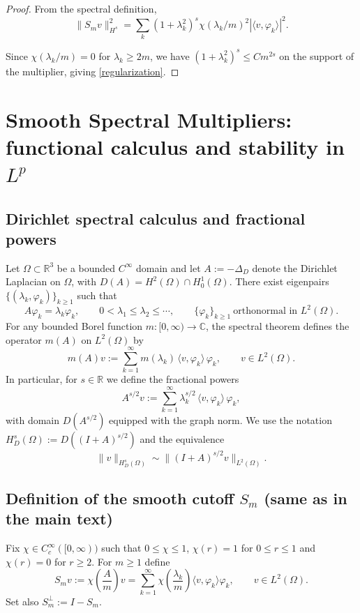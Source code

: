 \documentclass[11pt,letterpaper]{amsart}
\begin{document}
\begin{proof}
From the spectral definition,
\[
\|S_m v\|_{H^s}^2
=
\sum_{k} (1+\lambda_k^2)^s
\chi(\lambda_k/m)^2 |\langle v,\varphi_k\rangle|^2.
\]

Since $\chi(\lambda_k/m)=0$ for $\lambda_k \ge 2m$,
we have $(1+\lambda_k^2)^s \le C m^{2s}$ on the support
of the multiplier, giving \eqref{regularization}.
\end{proof}




\appendix
\section{Smooth Spectral Multipliers: functional calculus and stability in $L^p$}
\label{app:spectral-multipliers}

\subsection{Dirichlet spectral calculus and fractional powers}

Let $\Omega\subset\mathbb R^3$ be a bounded $C^\infty$ domain and let
$A:=-\Delta_D$ denote the Dirichlet Laplacian on $\Omega$, with
$D(A)=H^2(\Omega)\cap H_0^1(\Omega)$.
There exist eigenpairs $\{(\lambda_k,\varphi_k)\}_{k\ge1}$ such that
\[
A\varphi_k=\lambda_k\varphi_k,\qquad
0<\lambda_1\le\lambda_2\le\cdots,\qquad
\{\varphi_k\}_{k\ge1}\ \text{orthonormal in }L^2(\Omega).
\]
For any bounded Borel function $m:[0,\infty)\to\mathbb C$, the spectral theorem
defines the operator $m(A)$ on $L^2(\Omega)$ by
\[
m(A)v := \sum_{k=1}^\infty m(\lambda_k)\,\langle v,\varphi_k\rangle\,\varphi_k,
\qquad v\in L^2(\Omega).
\]
In particular, for $s\in\mathbb R$ we define the fractional powers
\[
A^{s/2}v := \sum_{k=1}^\infty \lambda_k^{s/2}\,\langle v,\varphi_k\rangle\,\varphi_k,
\]
with domain $D(A^{s/2})$ equipped with the graph norm. We use the notation
$H^s_D(\Omega):=D((I+A)^{s/2})$ and the equivalence
\[
\|v\|_{H^s_D(\Omega)}\sim \|(I+A)^{s/2}v\|_{L^2(\Omega)}.
\]

\subsection{Definition of the smooth cutoff $S_m$ (same as in the main text)}

Fix $\chi\in C_c^\infty([0,\infty))$ such that $0\le\chi\le1$,
$\chi(r)=1$ for $0\le r\le 1$ and $\chi(r)=0$ for $r\ge 2$.
For $m\ge1$ define
\begin{equation}\label{eq:Sm-def-app}
S_m v := \chi\!\left(\frac{A}{m}\right)v
       = \sum_{k=1}^\infty \chi\!\left(\frac{\lambda_k}{m}\right)\langle v,\varphi_k\rangle\varphi_k,
\qquad v\in L^2(\Omega).
\end{equation}
Set also $S_m^\perp:=I-S_m$.
\end{document}
